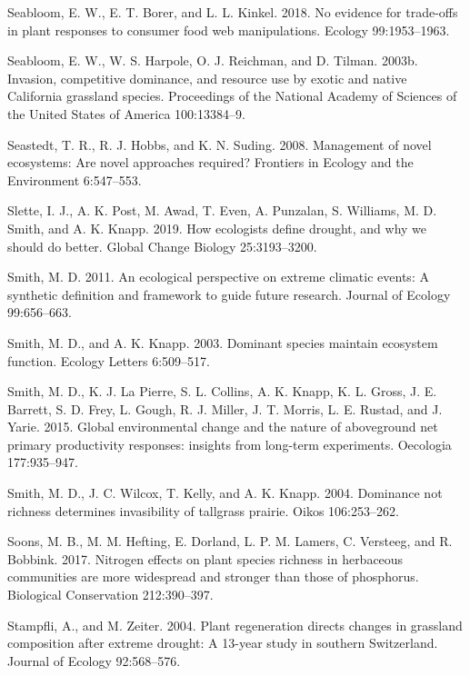\documentclass[twoside,12pt,final]{ucthesis-CA2012}
\begin{document}
\begin{ucmainmatter}
\leavevmode\hypertarget{ref-Seabloom2018}{}%
Seabloom, E. W., E. T. Borer, and L. L. Kinkel. 2018. No evidence for trade-offs in plant responses to consumer food web manipulations. Ecology 99:1953--1963.

\leavevmode\hypertarget{ref-Seabloom2003a}{}%
Seabloom, E. W., W. S. Harpole, O. J. Reichman, and D. Tilman. 2003b. Invasion, competitive dominance, and resource use by exotic and native California grassland species. Proceedings of the National Academy of Sciences of the United States of America 100:13384--9.

\leavevmode\hypertarget{ref-Seastedt2008}{}%
Seastedt, T. R., R. J. Hobbs, and K. N. Suding. 2008. Management of novel ecosystems: Are novel approaches required? Frontiers in Ecology and the Environment 6:547--553.

\leavevmode\hypertarget{ref-Slette2019}{}%
Slette, I. J., A. K. Post, M. Awad, T. Even, A. Punzalan, S. Williams, M. D. Smith, and A. K. Knapp. 2019. How ecologists define drought, and why we should do better. Global Change Biology 25:3193--3200.

\leavevmode\hypertarget{ref-Smith2011b}{}%
Smith, M. D. 2011. An ecological perspective on extreme climatic events: A synthetic definition and framework to guide future research. Journal of Ecology 99:656--663.

\leavevmode\hypertarget{ref-Smith2003}{}%
Smith, M. D., and A. K. Knapp. 2003. Dominant species maintain ecosystem function. Ecology Letters 6:509--517.

\leavevmode\hypertarget{ref-Smith2015}{}%
Smith, M. D., K. J. La Pierre, S. L. Collins, A. K. Knapp, K. L. Gross, J. E. Barrett, S. D. Frey, L. Gough, R. J. Miller, J. T. Morris, L. E. Rustad, and J. Yarie. 2015. Global environmental change and the nature of aboveground net primary productivity responses: insights from long-term experiments. Oecologia 177:935--947.

\leavevmode\hypertarget{ref-Smith2004}{}%
Smith, M. D., J. C. Wilcox, T. Kelly, and A. K. Knapp. 2004. Dominance not richness determines invasibility of tallgrass prairie. Oikos 106:253--262.

\leavevmode\hypertarget{ref-Soons2017}{}%
Soons, M. B., M. M. Hefting, E. Dorland, L. P. M. Lamers, C. Versteeg, and R. Bobbink. 2017. Nitrogen effects on plant species richness in herbaceous communities are more widespread and stronger than those of phosphorus. Biological Conservation 212:390--397.

\leavevmode\hypertarget{ref-Stampfli2004}{}%
Stampfli, A., and M. Zeiter. 2004. Plant regeneration directs changes in grassland composition after extreme drought: A 13-year study in southern Switzerland. Journal of Ecology 92:568--576.


\end{ucmainmatter}
\end{document}
